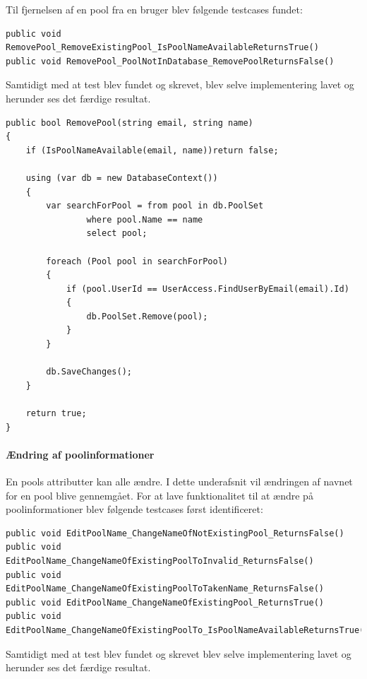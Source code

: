 Til fjernelsen af en pool fra en bruger blev følgende testcases fundet:

\begin{lstlisting}[caption=Testcases til RemovePool metoden]
public void RemovePool_RemoveExistingPool_IsPoolNameAvailableReturnsTrue()
public void RemovePool_PoolNotInDatabase_RemovePoolReturnsFalse()
\end{lstlisting}

Samtidigt med at test blev fundet og skrevet, blev selve implementering lavet og herunder ses det færdige resultat.

\begin{lstlisting}[caption=RemovePool metoden]
public bool RemovePool(string email, string name)
{
	if (IsPoolNameAvailable(email, name))return false;
	
	using (var db = new DatabaseContext())
	{
		var searchForPool = from pool in db.PoolSet
				where pool.Name == name
				select pool;
		
		foreach (Pool pool in searchForPool)
		{
			if (pool.UserId == UserAccess.FindUserByEmail(email).Id)
			{
				db.PoolSet.Remove(pool);
			}
		}
	
		db.SaveChanges();
	}
	
	return true;
}
\end{lstlisting}

\paragraph{Ændring af poolinformationer}

En pools attributter kan alle ændre. I dette underafsnit vil ændringen af navnet for en pool blive gennemgået. For at lave funktionalitet til at ændre på poolinformationer blev følgende testcases først identificeret:

\begin{lstlisting}[caption=Testcases til EditPoolName metoden]
public void EditPoolName_ChangeNameOfNotExistingPool_ReturnsFalse()
public void EditPoolName_ChangeNameOfExistingPoolToInvalid_ReturnsFalse()
public void EditPoolName_ChangeNameOfExistingPoolToTakenName_ReturnsFalse()
public void EditPoolName_ChangeNameOfExistingPool_ReturnsTrue()
public void EditPoolName_ChangeNameOfExistingPoolTo_IsPoolNameAvailableReturnsTrue()                        
\end{lstlisting}

Samtidigt med at test blev fundet og skrevet blev selve implementering lavet og herunder ses det færdige resultat.

